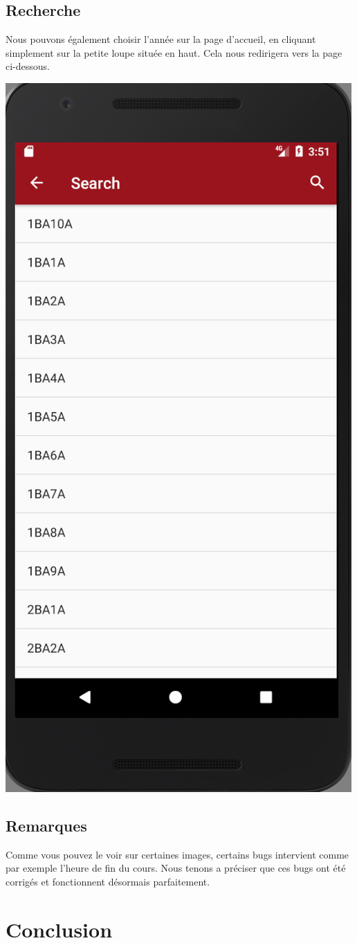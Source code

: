 \documentclass{article}
\begin{document}
	\subsection{Recherche}
	Nous pouvons \'egalement choisir l'ann\'ee sur la page d'accueil, en cliquant simplement sur la petite loupe situ\'ee en haut. Cela nous redirigera vers la page ci-dessous.
        \begin{center}
            \includegraphics[scale=0.4]{img/search.png}
        \end{center}

          \subsection{Remarques}
          Comme vous pouvez le voir sur certaines images, certains bugs intervient comme par exemple l'heure de fin du cours. Nous tenons a pr\'eciser que ces bugs ont \'et\'e corrig\'es et fonctionnent d\'esormais parfaitement.

    \section{Conclusion}
\end{document}
